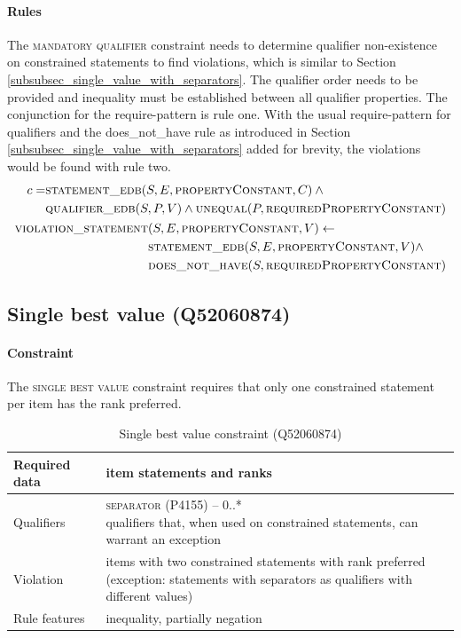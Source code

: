 \documentclass[hyperref,bachelorofscience,fleqn]{cgvpub}
\begin{document}
\paragraph{Rules}
The \textsc{mandatory qualifier} constraint needs to determine qualifier non-existence on constrained statements to find violations, which is similar to Section \ref{subsubsec_single_value_with_separators}. The qualifier order needs to be provided and inequality must be established between all qualifier properties. The conjunction for the require-pattern is rule one. With the usual require-pattern for qualifiers and the does\_not\_have rule as introduced in Section \ref{subsubsec_single_value_with_separators} added for brevity, the violations would be found with rule two.
\begin{align}
\begin{split}
c = &\textsc{statement\_edb}(S, E, \textsc{propertyConstant}, C) \wedge{} \\
&\textsc{qualifier\_edb}(S, P, V) \wedge \textsc{unequal}(P, \textsc{requiredPropertyConstant})
\end{split}\\
\begin{split}
\textsc{violation\_statement}&(S, E, \textsc{propertyConstant}, V) \leftarrow \\
&\textsc{statement\_edb}(S, E, \textsc{propertyConstant}, V) \wedge \\
&\textsc{does\_not\_have}(S, \textsc{requiredPropertyConstant})
\end{split}
\end{align}

\subsection{Single best value (Q52060874)}\label{subsec_single_best_value}
\paragraph{Constraint}
The \textsc{single best value} constraint requires that only one constrained statement per item has the rank preferred.

\begin{table}[H]
\caption{Single best value constraint (Q52060874)}
\begin{tabularx}{\textwidth}{ ll X}
\hline
Required data & item statements and ranks \\
\hline
Qualifiers & \makecell{\textsc{separator} (P4155) -- 0..* \\ qualifiers that, when used on constrained statements, can warrant an exception } \\
\hline
Violation & \makecell{items with two constrained statements with rank preferred \\ (exception: statements with separators as qualifiers with different values)} \\
\hline
Rule features & inequality, partially negation \\
\hline
\end{tabularx}
\end{table}
\end{document}
